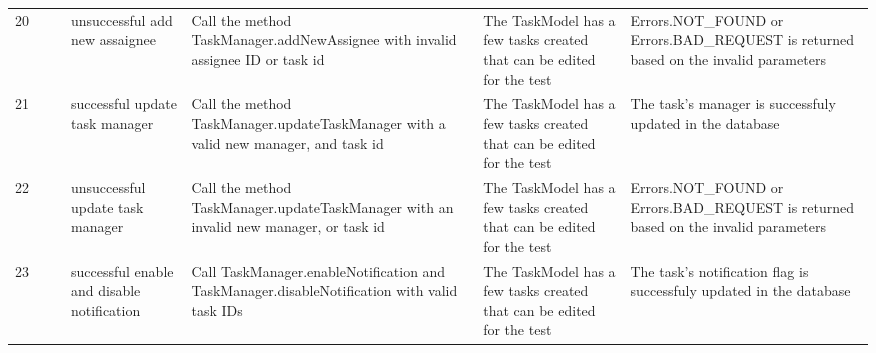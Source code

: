 \documentclass{article}
\begin{document}
{\begin{tabular}{|l|c|l|l|l|l|l|}
    \cellcolor[HTML]{FFFFFF}20                                    & \cellcolor[HTML]{FFFFFF}                                                     & \cellcolor[HTML]{FFFFFF}{\color[HTML]{11734B} Automated}        & unsuccessful add new assaignee                 & \cellcolor[HTML]{FFFFFF}Call the method TaskManager.addNewAssignee with invalid assignee ID or task id                           & \cellcolor[HTML]{FFFFFF}The TaskModel has a few tasks created that can be edited for the test  & \cellcolor[HTML]{FFFFFF}Errors.NOT\_FOUND or Errors.BAD\_REQUEST is returned based on the invalid parameters                  \\ \cline{1-1} \cline{3-7}
    \cellcolor[HTML]{FFFFFF}21                                    & \cellcolor[HTML]{FFFFFF}                                                     & \cellcolor[HTML]{FFFFFF}{\color[HTML]{11734B} Automated}        & successful update task manager                 & \cellcolor[HTML]{FFFFFF}Call the method TaskManager.updateTaskManager with a valid new manager, and task id                      & \cellcolor[HTML]{FFFFFF}The TaskModel has a few tasks created that can be edited for the test  & \cellcolor[HTML]{FFFFFF}The task's manager is successfuly updated in the database                                             \\ \cline{1-1} \cline{3-7}
    \cellcolor[HTML]{FFFFFF}22                                    & \cellcolor[HTML]{FFFFFF}                                                     & \cellcolor[HTML]{FFFFFF}{\color[HTML]{11734B} Automated}        & unsuccessful update task manager               & \cellcolor[HTML]{FFFFFF}Call the method TaskManager.updateTaskManager with an invalid new manager, or task id                    & \cellcolor[HTML]{FFFFFF}The TaskModel has a few tasks created that can be edited for the test  & \cellcolor[HTML]{FFFFFF}Errors.NOT\_FOUND or Errors.BAD\_REQUEST is returned based on the invalid parameters                  \\ \cline{1-1} \cline{3-7}
    \cellcolor[HTML]{FFFFFF}23                                    & \cellcolor[HTML]{FFFFFF}                                                     & \cellcolor[HTML]{FFFFFF}{\color[HTML]{11734B} Automated}        & successful enable and disable notification     & \cellcolor[HTML]{FFFFFF}Call TaskManager.enableNotification and TaskManager.disableNotification with valid task IDs              & \cellcolor[HTML]{FFFFFF}The TaskModel has a few tasks created that can be edited for the test  & \cellcolor[HTML]{FFFFFF}The task's notification flag is successfuly updated in the database                                   \\ \cline{1-1} \cline{3-7}

\end{tabular}}
\end{document}
